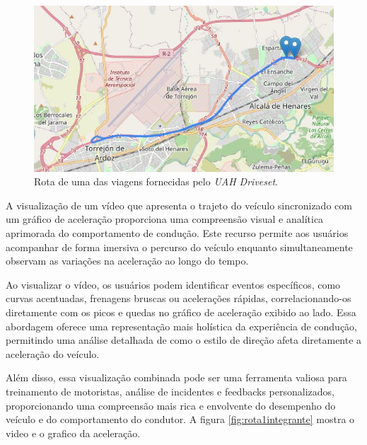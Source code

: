 \begin{figure}[hp]
    \centering
    
    \includegraphics[scale=0.8]{figures/rota_1.jpg}
    
    \caption{Rota de uma das viagens fornecidas pelo \textit{UAH Driveset}.}
    
    \label{fig:car_route_1}
\end{figure}

A visualização de um vídeo que apresenta o trajeto do veículo sincronizado com um gráfico de aceleração proporciona uma compreensão visual e analítica aprimorada do comportamento de condução. Este recurso permite aos usuários acompanhar de forma imersiva o percurso do veículo enquanto simultaneamente observam as variações na aceleração ao longo do tempo. 

Ao visualizar o vídeo, os usuários podem identificar eventos específicos, como curvas acentuadas, frenagens bruscas ou acelerações rápidas, correlacionando-os diretamente com os picos e quedas no gráfico de aceleração exibido ao lado. Essa abordagem oferece uma representação mais holística da experiência de condução, permitindo uma análise detalhada de como o estilo de direção afeta diretamente a aceleração do veículo. 

Além disso, essa visualização combinada pode ser uma ferramenta valiosa para treinamento de motoristas, análise de incidentes e feedbacks personalizados, proporcionando uma compreensão mais rica e envolvente do desempenho do veículo e do comportamento do condutor.
A figura \ref{fig:rota1integrante} mostra o video e o grafico da aceleração.

